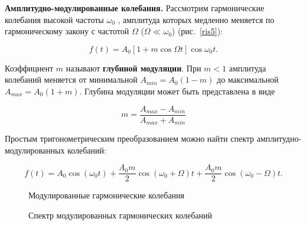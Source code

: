 \documentclass[a4paper, 12pt]{article}
\begin{document}
\textbf{Амплитудно-модулированные колебания.} Рассмотрим гармонические колебания высокой частоты $\omega_{0}$ , амплитуда которых медленно меняется по гармоническому закону с частотой $\Omega$ ($\Omega \ll \omega_{0}$) (рис.~\ref{ris5}):
	
$$f(t)=A_{0}[1+m\cos\Omega t]\cos \omega_{0}t.$$
	
Коэффициент $m$ называют \textbf{глубиной модуляции}. При $m<1$ амплитуда колебаний меняется от минимальной $A_{min}=A_{0}(1-m)$ до максимальной $A_{max}=A_{0}(1+m).$ Глубина модуляции может быть представлена в виде
	
\begin{equation}\label{m}
	 m=\dfrac{A_{max}-A_{min}}{A_{max}+A_{min}}
\end{equation}
	
Простым тригонометрическим преобразованием можно найти спектр амплитудно-модулированных колебаний:

\begin{equation}\label{a}
	f(t)=A_{0}\cos(\omega_{0} t)+\dfrac{A_{0}m}{2}\cos(\omega_{0}+\Omega)t+\dfrac{A_{0}m}{2}\cos(\omega_{0}-\Omega)t.
\end{equation}
		
\begin{figure}[h]
	\begin{minipage}[h]{0.5\linewidth}
		\caption{Модулированные гармонические колебания}
		\label{ris5}
	\end{minipage}
	\begin{minipage}[h]{0.5\linewidth}
		\caption{Спектр модулированных гармонических колебаний}
		\label{ris6}
	\end{minipage}
\end{figure}
		
\end{document}
